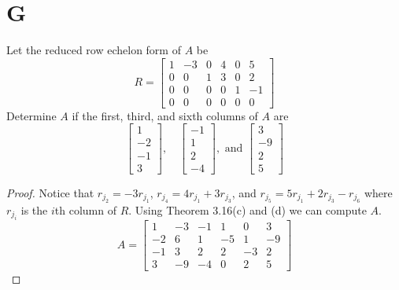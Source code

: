 \documentclass[11pt]{scrartcl}
\begin{document}
\section{G}
Let the reduced row echelon form of $A$ be
\[ 
R = \begin{bmatrix}
1 & -3 & 0 & 4 & 0 & 5 \\
0 & 0 & 1 & 3 & 0 & 2 \\
0 & 0 & 0 & 0 & 1 & -1 \\
0 & 0 & 0 & 0 & 0 & 0
\end{bmatrix}
\]
Determine $A$ if the first, third, and sixth columns of $A$ are
$$
\begin{bmatrix}
	1 \\
	-2 \\
	-1 \\
	3
	\end{bmatrix}, \quad \begin{bmatrix}
	-1 \\
	1 \\
	2 \\
	-4
	\end{bmatrix}, \text { and } \begin{bmatrix}
	3 \\
	-9 \\
	2 \\
	5
\end{bmatrix}
$$
\begin{proof}
	Notice that 
	$r_{j_{2}} = -3r_{j_{1}}$,
	$r_{j_{4}} = 4r_{j_{1}} + 3r_{j_{3}}$, and 
	$r_{j_{5}} = 5r_{j_{1}} + 2r_{j_{3}} - r_{j_{6}}$
	where $r_{j_{i}}$ is the 
	$i$th column of $R$. Using Theorem 3.16(c) and (d) we can compute $A$. 
	\[ 
		A = \begin{bmatrix}
		1 & -3 & -1 & 1 & 0 & 3 \\
		-2 & 6 & 1 & -5 & 1 & -9\\
		-1 & 3 & 2 & 2 & -3 & 2\\
		3 & -9 & -4 & 0 & 2 & 5
		\end{bmatrix}
		\]
\end{proof}
\end{document}
